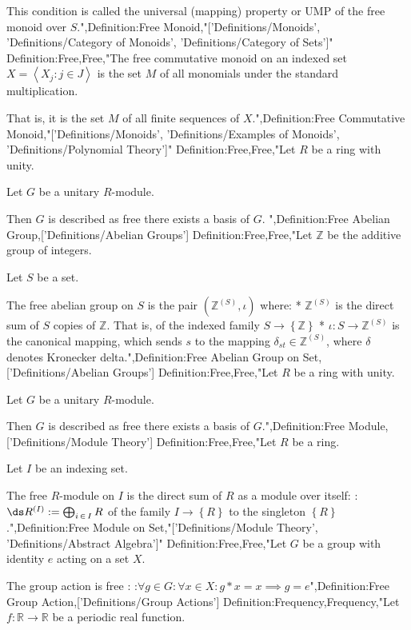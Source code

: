 This condition is called the universal (mapping) property or UMP of the free monoid over $S$.",Definition:Free Monoid,"['Definitions/Monoids', 'Definitions/Category of Monoids', 'Definitions/Category of Sets']"
Definition:Free,Free,"The free commutative monoid on an indexed set $X = \left\langle X_j: j \in J \right\rangle$ is the set $M$ of all monomials under the standard multiplication.


That is, it is the set $M$ of all finite sequences of $X$.",Definition:Free Commutative Monoid,"['Definitions/Monoids', 'Definitions/Examples of Monoids', 'Definitions/Polynomial Theory']"
Definition:Free,Free,"Let $R$ be a ring with unity.

Let $G$ be a unitary $R$-module.


Then $G$ is described as free  there exists a basis of $G$.
",Definition:Free Abelian Group,['Definitions/Abelian Groups']
Definition:Free,Free,"Let $\mathbb Z$ be the additive group of integers.

Let $S$ be a set.


The free abelian group on $S$ is the pair $\left( \mathbb Z^{\left( S \right)}, \iota \right)$ where:
* $\mathbb Z^{\left( S \right)}$ is the direct sum of $S$ copies of $\mathbb Z$. That is, of the indexed family $S \to \left\lbrace \mathbb Z \right\rbrace$
* $\iota : S \to \mathbb Z^{\left( S \right)}$ is the canonical mapping, which sends $s$ to the mapping $\delta_{st} \in \mathbb Z^{\left( S \right)}$, where $\delta$ denotes Kronecker delta.",Definition:Free Abelian Group on Set,['Definitions/Abelian Groups']
Definition:Free,Free,"Let $R$ be a ring with unity.

Let $G$ be a unitary $R$-module.


Then $G$ is described as free  there exists a basis of $G$.",Definition:Free Module,['Definitions/Module Theory']
Definition:Free,Free,"Let $R$ be a ring.



Let $I$ be an indexing set.


The free $R$-module on $I$ is the direct sum of $R$ as a module over itself:
:$\ds R^{\left( I \right)} := \bigoplus_{i \mathop \in I} R$
of the family $I \to \left\lbrace R \right\rbrace$ to the singleton $\left\lbrace R \right\rbrace$.",Definition:Free Module on Set,"['Definitions/Module Theory', 'Definitions/Abstract Algebra']"
Definition:Free,Free,"Let $G$ be a group with identity $e$ acting on a set $X$.


The group action is free :
:$\forall g \in G: \forall x \in X : g * x = x \implies g = e$",Definition:Free Group Action,['Definitions/Group Actions']
Definition:Frequency,Frequency,"Let $f: \mathbb R \to \mathbb R$ be a periodic real function.

